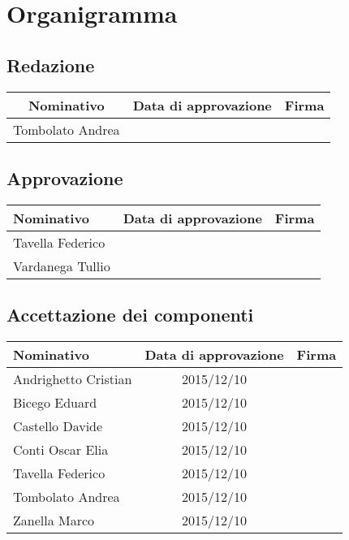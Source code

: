 \documentclass[../PianoProgetto.tex]{subfiles}
\begin{document}
\section{Organigramma}
	\subsection{Redazione}
		\begin{table}[h]
		\centering
	
		\begin{tabular}{ccc}
			\toprule
			Nominativo & Data di approvazione & Firma \\
			\midrule
			Tombolato Andrea &  &  \\
			\bottomrule
		\end{tabular}
		
	\end{table}	
	
	\subsection{Approvazione}
	
		\begin{table}[h]
		\centering
	
		\begin{tabular}{lcc}
			\toprule
			Nominativo & Data di approvazione & Firma \\
			\midrule
			Tavella Federico &  &  \\
			\midrule
			Vardanega Tullio &  &  \\
			\bottomrule
		\end{tabular}
		
	\end{table}		
	
	\subsection{Accettazione dei componenti}
	
		\begin{table}[h]
		\centering
	
		\begin{tabular}{lcc}
			\toprule
			Nominativo & Data di approvazione & Firma \\
			\midrule
			Andrighetto Cristian & 2015/12/10 &	 \\
			\midrule
			Bicego Eduard& 2015/12/10 &	 \\
			\midrule
			Castello Davide	& 2015/12/10 &	 \\
			\midrule
			Conti Oscar Elia & 2015/12/10 &	 \\
			\midrule
			Tavella Federico & 2015/12/10 &	 \\
			\midrule
			Tombolato Andrea & 2015/12/10 &	 \\
			\midrule
			Zanella Marco & 2015/12/10 &	 \\
			\bottomrule
		\end{tabular}
		
	\end{table}
				
\end{document}
